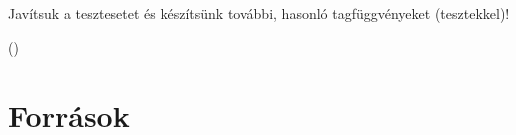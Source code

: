 \documentclass[usenames,dvipsnames,aspectratio=169]{beamer}
\begin{document}
\begin{frame}
  Javítsuk a tesztesetet és készítsünk további, hasonló tagfüggvényeket (tesztekkel)!
  \begin{exampleblock}{ %
    ()}
    \small
    
  \end{exampleblock}
\end{frame}

\begin{frame}
  \begin{exampleblock}{}
    
    
    
    
    
  \end{exampleblock}
\end{frame}

\begin{frame}
  \begin{exampleblock}{}
    \scriptsize
    
  \end{exampleblock}
\end{frame}

\begin{frame}
  \begin{exampleblock}{}
    \scriptsize
    
  \end{exampleblock}
\end{frame}


\section{Források}
\end{document}

